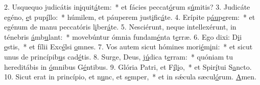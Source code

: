 2. Usquequo judicátis in\uline{i}quit\uline{á}tem:~* et fácies peccat\uline{ó}rum s\uline{ú}mitis?
3. Judicáte egéno, \uline{e}t pup\uline{í}llo:~* húmilem, et páuperem just\uline{i}fic\uline{á}te.
4. Erípite p\uline{áu}p\uline{e}rem:~* et egénum de manu peccatóris l\uline{i}ber\uline{á}te.
5. Nesciérunt, neque intellexérunt, in ténebris \uline{á}mb\uline{u}lant:~* movebúntur ómnia fundam\uline{é}nta t\uline{e}rræ.
6. Ego dixi: D\uline{i}i \uline{e}stis,~* et fílii Exc\uline{é}lsi \uline{o}mnes.
7. Vos autem sicut hómines mori\uline{é}m\uline{i}ni:~* et sicut unus de princípib\uline{u}s cad\uline{é}tis.
8. Surge, Deus, j\uline{ú}dica t\uline{e}rram:~* quóniam tu hereditábis in \uline{ó}mnibus G\uline{é}ntibus.
9. Glória Patri, et F\uline{í}l\uline{i}o,~* et Spir\uline{í}tui S\uline{a}ncto.
10. Sicut erat in princípio, et n\uline{u}nc, et s\uline{e}mper,~* et in sǽcula sæcul\uline{ó}rum. \uline{A}men.
